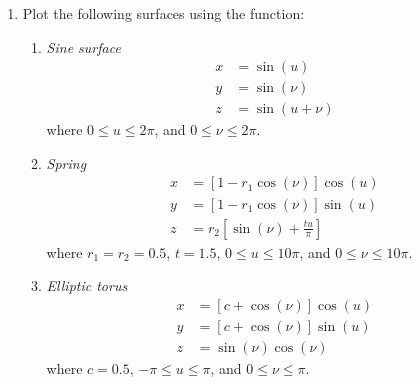 {\begin{minipage}{\linewidth}
\begin{enumerate}
\item Plot the following surfaces using the  function:
	\begin{enumerate}
	\item \textit{Sine surface}
		\begin{align*}
		x&= \sin(u) \\
		y&= \sin(\nu) \\
		z&= \sin(u+\nu)
		\end{align*}
		where $0 \leq u \leq 2\pi$, and $0 \leq \nu \leq 2\pi$.
	\item \textit{Spring}
		\begin{align*}
		x&= \left[1-r_1 \cos(\nu)\right]\cos(u) \\
		y&= \left[1-r_1 \cos(\nu)\right]\sin(u) \\
		z&= r_2 \left[\sin(\nu)+\frac{tu}{\pi}\right]
		\end{align*}
		where $r_1=r_2=0.5$, $t=1.5$, $0 \leq u \leq 10\pi$, and $0 \leq \nu \leq 10\pi$.
	\item \textit{Elliptic torus}
		\begin{align*}
		x&= \left[c+\cos(\nu)\right]\cos(u) \\
		y&= \left[c+\cos(\nu)\right]\sin(u) \\
		z&= \sin(\nu)\cos(\nu)
		\end{align*}
		where $c=0.5$, $-\pi \leq u \leq \pi$, and $0 \leq \nu \leq \pi$. 
	\end{enumerate}
\end{enumerate}

\end{minipage}%
}\\
\addtolength{\parindent}{4mm}

